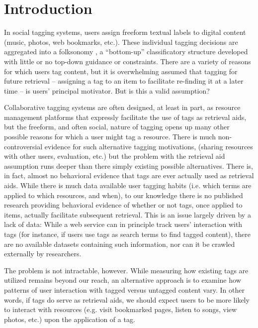 \section{Introduction}
\label{sec_intro}

In social tagging systems, users assign freeform textual labels to digital content (music, photos, web bookmarks, etc.). These individual tagging decisions are aggregated into a folksonomy \cite{VanderWal2007}, a ``bottom-up'' classificatory structure developed with little or no top-down guidance or constraints. There are a variety of reasons for which users tag content, but it is overwhelming assumed that tagging for future retrieval -- assigning a tag to an item to facilitate re-finding it at a later time -- is users' principal motivator. But is this a valid assumption?

Collaborative tagging systems are often designed, at least in part, as resource management platforms that expressly facilitate the use of tags as retrieval aids, but the freeform, and often social, nature of tagging opens up many other possible reasons for which a user might tag a resource. There is much non-controversial evidence for such alternative tagging motivations, (sharing resources with other users, evaluation, etc.) but the problem with the retrieval aid assumption runs deeper than there simply existing possible alternatives. There is, in fact, almost no behavioral evidence that tags are ever actually used as retrieval aids. While there is much data available user tagging habits (i.e. which terms are applied to which resources, and when), to our knowledge there is no published research providing behavioral evidence of whether or not tags, once applied to items, actually facilitate subsequent retrieval. This is an issue largely driven by a lack of data: While a web service can in principle track users' interaction with tags (for instance, if users use tags as search terms to find tagged content), there are no available datasets containing such information, nor can it be crawled externally by researchers.

The problem is not intractable, however. While measuring how existing tags are utilized remains beyond our reach, an alternative approach is to examine how patterns of user interaction with tagged versus untagged content vary. In other words, if tags do serve as retrieval aids, we should expect users to be more likely to interact with resources (e.g. visit bookmarked pages, listen to songs, view photos, etc.) upon the application of a tag.

